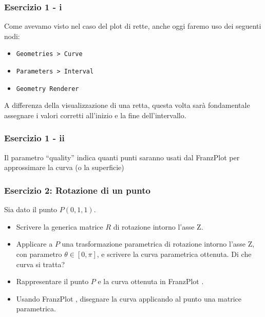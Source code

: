 \documentclass{beamer}
\newcommand{\fig}{figures} %
\newcommand{\frnzplt}{FranzPlot }
\begin{document}
\begin{frame}
\frametitle{Esercizio 1 - i}
    Come avevamo visto nel caso del plot di rette, anche oggi faremo uso dei seguenti nodi:
    \begin{itemize}
        \item \texttt{Geometries > Curve} 
        \item \texttt{Parameters > Interval}
        \item \texttt{Geometry Renderer}
    \end{itemize}

    \vspace{0.5cm}
    A differenza della visualizzazione di una retta, questa volta sar\`a fondamentale assegnare i valori corretti
    all'inizio e la fine dell'intervallo.
\end{frame}
%
\begin{frame}
\frametitle{Esercizio 1 - ii}
\begin{center}
\end{center}
    Il parametro ``quality'' indica quanti punti saranno usati dal \frnzplt per
    approssimare la curva (o la superficie)

\end{frame}
\begin{frame}
\frametitle{Esercizio 2: Rotazione di un punto}

    Sia dato il punto $P(0, 1, 1)$.
    \begin{itemize}
        \item Scrivere la generica matrice $R$ di rotazione intorno l'asse Z.
        \item Applicare a $P$ una trasformazione parametrica di rotazione intorno l'asse Z, con parametro $\theta \in [0, \pi]$,
            e scrivere la curva parametrica ottenuta. Di che curva si tratta?
        \item Rappresentare il punto $P$ e la curva ottenuta in \frnzplt.
        \item Usando \frnzplt, disegnare la curva applicando al punto una matrice parametrica.
    \end{itemize}

\end{frame}
\end{document}
